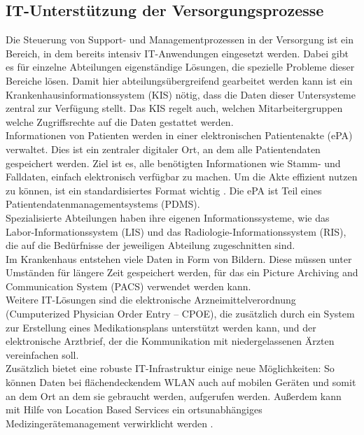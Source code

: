 \subsection{IT-Unterstützung der Versorgungsprozesse}
Die Steuerung von Support- und Managementprozessen in der Versorgung ist ein Bereich, in dem bereits intensiv IT-Anwendungen eingesetzt werden. Dabei gibt es für einzelne Abteilungen eigenständige Lösungen, die spezielle Probleme dieser Bereiche lösen. Damit hier abteilungsübergreifend gearbeitet werden kann ist ein Krankenhausinformationssystem (KIS) nötig, dass die Daten dieser Untersysteme zentral zur Verfügung stellt. Das KIS regelt auch, welchen Mitarbeitergruppen welche Zugriffsrechte auf die Daten gestattet werden.\\

Informationen von Patienten werden in einer elektronischen Patientenakte (ePA) verwaltet. Dies ist ein zentraler digitaler Ort, an dem alle Patientendaten gespeichert werden. Ziel ist es, alle benötigten Informationen wie Stamm- und Falldaten, einfach elektronisch verfügbar zu machen. Um die Akte effizient nutzen zu können, ist ein standardisiertes Format wichtig \parencite{oswald2019}. Die ePA ist Teil eines Patientendatenmanagementsystems (PDMS).\\

Spezialisierte Abteilungen haben ihre eigenen Informationssysteme, wie das Labor-Informationssystem (LIS) und das Radiologie-Informationssystem (RIS), die auf die Bedürfnisse der jeweiligen Abteilung zugeschnitten sind.\\

Im Krankenhaus entstehen viele Daten in Form von Bildern. Diese müssen unter Umständen für längere Zeit gespeichert werden, für das ein Picture Archiving and Communication System (PACS) verwendet werden kann.\\

Weitere IT-Lösungen sind die elektronische Arzneimittelverordnung (Cumputerized Physician Order Entry -- CPOE), die zusätzlich durch ein System zur Erstellung eines Medikationsplans unterstützt werden kann, und der elektronische Arztbrief, der die Kommunikation mit niedergelassenen Ärzten vereinfachen soll. \parencite{braeutigam2017}\\

Zusätzlich bietet eine robuste IT-Infrastruktur einige neue Möglichkeiten: So können Daten bei flächendeckendem WLAN auch auf mobilen Geräten und somit an dem Ort an dem sie gebraucht werden, aufgerufen werden. Außerdem kann mit Hilfe von Location Based Services ein ortsunabhängiges Medizingerätemanagement verwirklicht werden \parencite{mci/Leimeister2006}.

